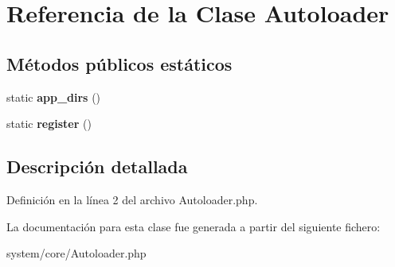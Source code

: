 \hypertarget{class_autoloader}{}\section{Referencia de la Clase Autoloader}
\label{class_autoloader}
\subsection*{Métodos públicos estáticos}
\begin{DoxyCompactItemize}
\item 
\mbox{\label{class_autoloader_ad1af7fdc61b9d8e6607ac59019adaa41}} 
static {\bfseries app\+\_\+dirs} ()
\item 
\mbox{\label{class_autoloader_a818817cb215d74d3c65e4855898b8902}} 
static {\bfseries register} ()
\end{DoxyCompactItemize}


\subsection{Descripción detallada}


Definición en la línea 2 del archivo Autoloader.\+php.



La documentación para esta clase fue generada a partir del siguiente fichero\+:\begin{DoxyCompactItemize}
\item 
system/core/Autoloader.\+php\end{DoxyCompactItemize}
